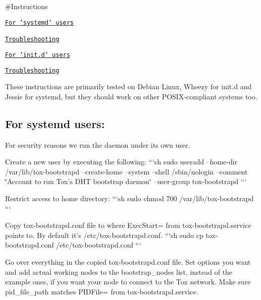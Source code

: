 \#\+Instructions


\begin{DoxyItemize}
\item \href{#systemd}{\tt For `systemd` users}
\begin{DoxyItemize}
\item \href{#systemd-troubleshooting}{\tt Troubleshooting} ~\newline

\end{DoxyItemize}
\item \href{#initd}{\tt For `init.d` users}
\begin{DoxyItemize}
\item \href{#initd-troubleshooting}{\tt Troubleshooting}
\end{DoxyItemize}
\end{DoxyItemize}

These instructions are primarily tested on Debian Linux, Wheezy for init.\+d and Jessie for systemd, but they should work on other P\+O\+S\+I\+X-\/compliant systems too.

\label{_systemd}%
 \subsection*{For {\ttfamily systemd} users\+:}

For security reasons we run the daemon under its own user.

Create a new user by executing the following\+: ```sh sudo useradd --home-\/dir /var/lib/tox-\/bootstrapd --create-\/home --system --shell /sbin/nologin --comment \char`\"{}\+Account to run Tox's D\+H\+T bootstrap daemon\char`\"{} --user-\/group tox-\/bootstrapd ```

Restrict access to home directory\+: ```sh sudo chmod 700 /var/lib/tox-\/bootstrapd ```

Copy {\ttfamily tox-\/bootstrapd.\+conf} file to where {\ttfamily Exec\+Start=} from {\ttfamily tox-\/bootstrapd.\+service} points to. By default it's {\ttfamily /etc/tox-\/bootstrapd.conf}. ```sh sudo cp tox-\/bootstrapd.\+conf /etc/tox-\/bootstrapd.conf ```

Go over everything in the copied {\ttfamily tox-\/bootstrapd.\+conf} file. Set options you want and add actual working nodes to the {\ttfamily bootstrap\+\_\+nodes} list, instead of the example ones, if you want your node to connect to the Tox network. Make sure {\ttfamily pid\+\_\+file\+\_\+path} matches {\ttfamily P\+I\+D\+File=} from {\ttfamily tox-\/bootstrapd.\+service}.

